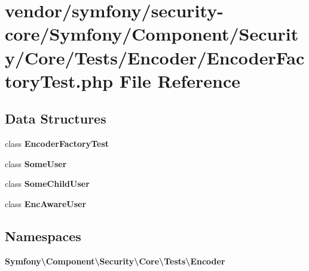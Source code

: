 \section{vendor/symfony/security-\/core/\+Symfony/\+Component/\+Security/\+Core/\+Tests/\+Encoder/\+Encoder\+Factory\+Test.php File Reference}
\label{_encoder_factory_test_8php}
\subsection*{Data Structures}
\begin{DoxyCompactItemize}
\item 
class {\bf Encoder\+Factory\+Test}
\item 
class {\bf Some\+User}
\item 
class {\bf Some\+Child\+User}
\item 
class {\bf Enc\+Aware\+User}
\end{DoxyCompactItemize}
\subsection*{Namespaces}
\begin{DoxyCompactItemize}
\item 
 {\bf Symfony\textbackslash{}\+Component\textbackslash{}\+Security\textbackslash{}\+Core\textbackslash{}\+Tests\textbackslash{}\+Encoder}
\end{DoxyCompactItemize}
